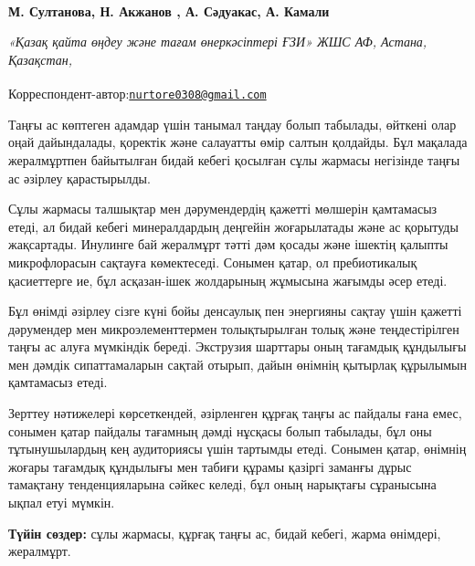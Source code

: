 
\begin{articleheader}

{\bfseries
М. Султанова\authorid,
Н. Акжанов\textsuperscript{\envelope } \authorid,
А. Сәдуакас\authorid,
А. Камали\authorid}
\end{articleheader}

\begin{affiliation}
\emph{«Қазақ қайта өңдеу және тағам өнеркәсіптері ҒЗИ» ЖШС АФ, Астана, Қазақстан,}

\raggedright \textsuperscript{\envelope }Корреспондент-автор:\href{mailto:nurtore0308@gmail.com}{\nolinkurl{nurtore0308@gmail.com}}
\end{affiliation}

Таңғы ас көптеген адамдар үшін танымал таңдау болып табылады, өйткені
олар оңай дайындалады, қоректік және салауатты өмір салтын қолдайды. Бұл
мақалада жералмұртпен байытылған бидай кебегі қосылған сұлы жармасы
негізінде таңғы ас әзірлеу қарастырылды.

Сұлы жармасы талшықтар мен дәрумендердің қажетті мөлшерін қамтамасыз
етеді, ал бидай кебегі минералдардың деңгейін жоғарылатады және ас
қорытуды жақсартады. Инулинге бай жералмұрт тәтті дәм қосады және
ішектің қалыпты микрофлорасын сақтауға көмектеседі. Сонымен қатар, ол
пребиотикалық қасиеттерге ие, бұл асқазан-ішек жолдарының жұмысына
жағымды әсер етеді.

Бұл өнімді әзірлеу сізге күні бойы денсаулық пен энергияны сақтау үшін
қажетті дәрумендер мен микроэлементтермен толықтырылған толық және
теңдестірілген таңғы ас алуға мүмкіндік береді. Экструзия шарттары оның
тағамдық құндылығы мен дәмдік сипаттамаларын сақтай отырып, дайын
өнімнің қытырлақ құрылымын қамтамасыз етеді.

Зерттеу нәтижелері көрсеткендей, әзірленген құрғақ таңғы ас пайдалы ғана
емес, сонымен қатар пайдалы тағамның дәмді нұсқасы болып табылады, бұл
оны тұтынушылардың кең аудиториясы үшін тартымды етеді. Сонымен қатар,
өнімнің жоғары тағамдық құндылығы мен табиғи құрамы қазіргі заманғы
дұрыс тамақтану тенденцияларына сәйкес келеді, бұл оның нарықтағы
сұранысына ықпал етуі мүмкін.

{\bfseries Түйін сөздер:} сұлы жармасы, құрғақ таңғы ас, бидай кебегі,
жарма өнімдері, жералмұрт.

